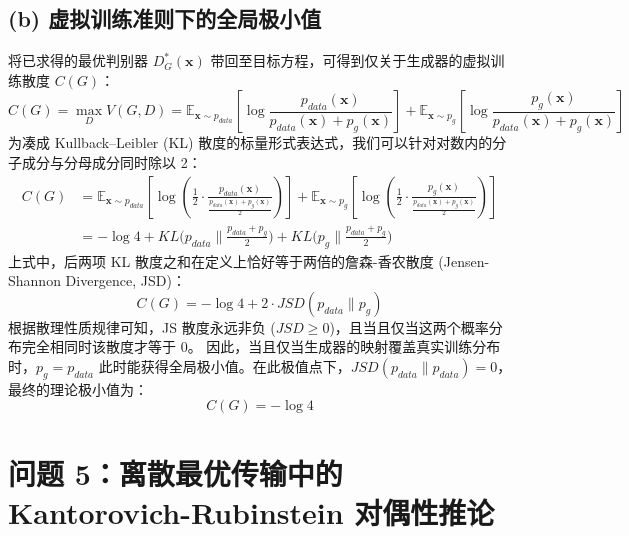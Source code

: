 \documentclass[11pt,UTF8]{ctexart}
\begin{document}
\subsection*{(b) 虚拟训练准则下的全局极小值}
将已求得的最优判别器 $D^*_G(\mathbf{x})$ 带回至目标方程，可得到仅关于生成器的虚拟训练散度 $C(G)$：
\begin{equation}
    C(G) = \max_{D} V(G, D) = \mathbb{E}_{\mathbf{x} \sim p_{data}} \left[ \log \frac{p_{data}(\mathbf{x})}{p_{data}(\mathbf{x}) + p_g(\mathbf{x})} \right] + \mathbb{E}_{\mathbf{x} \sim p_g} \left[ \log \frac{p_g(\mathbf{x})}{p_{data}(\mathbf{x}) + p_g(\mathbf{x})} \right]
\end{equation}
为凑成 Kullback–Leibler (KL) 散度的标量形式表达式，我们可以针对对数内的分子成分与分母成分同时除以 2：
\begin{align*}
    C(G) &= \mathbb{E}_{\mathbf{x} \sim p_{data}} \left[ \log \left( \frac{1}{2} \cdot \frac{p_{data}(\mathbf{x})}{\frac{p_{data}(\mathbf{x}) + p_g(\mathbf{x})}{2}} \right) \right] + \mathbb{E}_{\mathbf{x} \sim p_g} \left[ \log \left( \frac{1}{2} \cdot \frac{p_{g}(\mathbf{x})}{\frac{p_{data}(\mathbf{x}) + p_g(\mathbf{x})}{2}} \right) \right] \\
    &= -\log 4 + KL\Big(p_{data} \Big\| \frac{p_{data} + p_g}{2}\Big) + KL\Big(p_g \Big\| \frac{p_{data} + p_g}{2}\Big)
\end{align*}
上式中，后两项 KL 散度之和在定义上恰好等于两倍的詹森-香农散度 (Jensen-Shannon Divergence, JSD)：
\begin{equation}
    C(G) = -\log 4 + 2 \cdot JSD(p_{data} \| p_g)
\end{equation}
根据散理性质规律可知，JS 散度永远非负 ($JSD \geq 0$)，且当且仅当这两个概率分布完全相同时该散度才等于 0。
因此，当且仅当生成器的映射覆盖真实训练分布时，$p_g = p_{data}$ 此时能获得全局极小值。在此极值点下，$JSD(p_{data} \| p_{data}) = 0$，最终的理论极小值为：
\begin{equation}
    C(G) = -\log 4
\end{equation}


\section*{问题 5：离散最优传输中的 Kantorovich-Rubinstein 对偶性推论}
\end{document}
